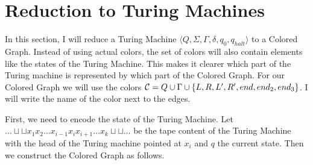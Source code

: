 \section{Reduction to Turing Machines}

In this section, I will reduce a Turing Machine $\langle Q, \Sigma, \Gamma, \delta, q_0, q_{halt} \rangle$ to a Colored Graph.
Instead of using actual colors, the set of colors will also contain elements like the states of the Turing Machine.
This makes it clearer which part of the Turing machine is represented by which part of the Colored Graph.
For our Colored Graph we will use the colors $\mathcal{C} = Q \cup \Gamma \cup \{L, R, L', R', end, end_2, end_3\}$.
I will write the name of the color next to the edges.

First, we need to encode the state of the Turing Machine.
Let $\ldots\sqcup\sqcup x_1 x_2 \ldots x_{i-1} x_{i} x_{i+1} \ldots x_k \sqcup\sqcup\ldots$ be the tape content of the Turing Machine with the head of the Turing machine pointed at $x_i$ and $q$ the current state.
Then we construct the Colored Graph as follows.

